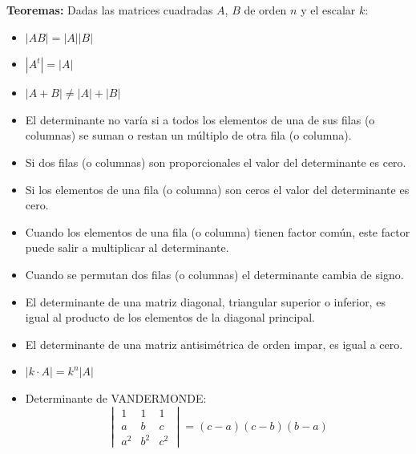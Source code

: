 \documentclass[11pt,a4paper]{article}
\newcommand{\hl}[1]{\textcolor{resaltado}{#1}}
\begin{document}
\medskip
\textbf{Teoremas:} Dadas las matrices cuadradas $A$, $B$ de orden $n$ y el escalar $k$:

\begin{minipage}[t]{0.291\textwidth}
\begin{itemize}[label=\textcolor{naranja}{\checkmark}]
  \item $|AB| = |A||B|$
  \item $|A^t| = |A|$
  \item $|A + B| \neq |A| + |B|$
\end{itemize}
\end{minipage}\hfill
\begin{minipage}[t]{0.679\textwidth}
\begin{itemize}[label=\textcolor{naranja}{\checkmark}]
  \item El determinante no varía si a todos los elementos de una de sus filas (o
  columnas) se suman o restan un múltiplo de otra fila (o columna).
  \item Si dos filas (o columnas) son proporcionales el valor del determinante es
  \hl{cero}.
\end{itemize}
\end{minipage}
\begin{itemize}[label=\textcolor{naranja}{\checkmark}]
  \item Si los elementos de una fila (o columna) son \hl{ceros} el valor del determinante
  es \hl{cero}.
  \item Cuando los elementos de una fila (o columna) tienen factor común, este factor
  puede salir a multiplicar al determinante.
  \item Cuando se permutan dos filas (o columnas) el determinante cambia de signo.
  \item El determinante de una matriz diagonal, triangular superior o inferior, es igual
  al producto de los elementos de la diagonal principal.
  \item El determinante de una matriz antisimétrica \hl{de orden impar}, es igual a
  \hl{cero}.
  \item $|k\cdot A| = k^n|A|$
  \item Determinante de VANDERMONDE:
  \[
  \begin{vmatrix} 1 & 1 & 1\\ a & b & c\\ a^2 & b^2 & c^2\end{vmatrix} = (c-a)(c-b)(b-a)
  \]
\end{itemize}
\end{document}
